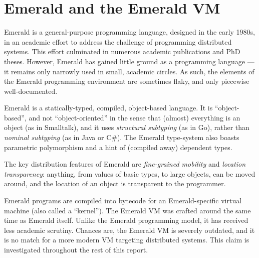 \section{Emerald and the Emerald VM}

Emerald is a general-purpose programming language, designed in the
early 1980s, in an academic effort to address the challenge of
programming distributed systems. This effort culminated in numerous
academic publications\cite{emerald:tse:1987, emerald:tocs:1988,
emerald:spe:1991} and PhD theses\cite{emerald:phd:norman-c-hutchinson,
emerald:phd:eric-jul, emerald:phd:niels-christian-juul}. However,
Emerald has gained little ground as a programming language --- it
remains only narrowly used in small, academic circles. As such, the
elements of the Emerald programming environment are sometimes flaky,
and only piecewise well-documented.

Emerald is a statically-typed, compiled, object-based language. It is
``object-based'', and not ``object-oriented'' in the sense that
(almost) everything is an object (as in Smalltalk), and it uses
\emph{structural subtyping} (as in Go), rather than \emph{nominal
subtyping} (as in Java or C\#). The Emerald type-system also boasts
parametric polymorphism and a hint of (compiled away) dependent types.

The key distribution features of Emerald are \emph{fine-grained
mobility} and \emph{location transparency}: anything, from values of
basic types, to large objects, can be moved around, and the location
of an object is transparent to the programmer.

Emerald programs are compiled into bytecode for an Emerald-specific
virtual machine (also called a ``kernel''\cite{emerald:phd:eric-jul}).
The Emerald VM was crafted around the same time as Emerald itself.
Unlike the Emerald programming model, it has received less academic
scrutiny. Chances are, the Emerald VM is severely outdated, and it is
no match for a more modern VM targeting distributed systems. This
claim is investigated throughout the rest of this report.
